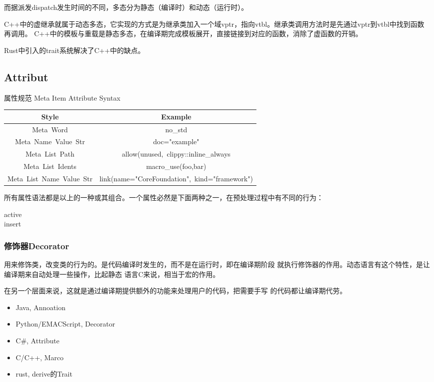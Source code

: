 而据派发dispatch发生时间的不同，多态分为静态（编译时）和动态（运行时）。

C++中的虚继承就属于动态多态，它实现的方式是为继承类加入一个域vptr，指向vtbl。继承类调用方法时是先通过vptr到vtbl中找到函数再调用。
C++中的模板与重载是静态多态，在编译期完成模板展开，直接链接到对应的函数，消除了虚函数的开销。

Rust中引入的trait系统解决了C++中的缺点。

\subsection{Attribut}

属性规范\cite{ECMA334} Meta Item Attribute Syntax

\begin{tabular}{|c|c|}
    \hline
    Style & Example \\ \hline
    \hbox{Meta Word} & \hbox{no\_std} \\ \hline
    \hbox{Meta Name Value Str} & \hbox{doc="example"} \\ \hline
    \hbox{Meta List Path} & \hbox{allow(unused, clippy::inline\_always} \\ \hline
    \hbox{Meta List Idents} & \hbox{macro\_use(foo,bar)} \\ \hline
    \hbox{Meta List Name Value Str} & \hbox{link(name="CoreFoundation", kind="framework")} \\ \hline
\end{tabular}

所有属性语法都是以上的一种或其组合。一个属性必然是下面两种之一，在预处理过程中有不同的行为：

\begin{description}
    \item [active] 
    \item [insert] 
\end{description}

\subsubsection{修饰器Decorator}
用来修饰类，改变类的行为的。是代码编译时发生的，而不是在运行时，即在编译期阶段
就执行修饰器的作用。动态语言有这个特性，是让编译期来自动处理一些操作，比起静态
语言C来说，相当于宏的作用。

在另一个层面来说，这就是通过编译期提供额外的功能来处理用户的代码，把需要手写
的代码都让编译期代劳。
\begin{itemize}
    \item {Java, Annoation}
    \item {Python/EMACScript, Decorator}
    \item {C\#, Attribute}
    \item {C/C++, Marco}
    \item {rust, derive的Trait}
\end{itemize}


